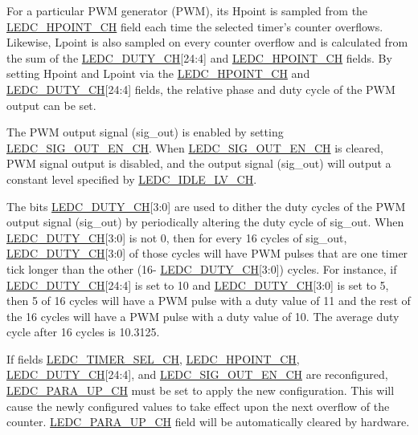 \documentclass[main\_\_EN.tex]{subfiles}
\begin{document}
For a particular PWM generator (PWM), its Hpoint is sampled from the \hyperref[fielddesc:LEDCHPOINTCHN]{LEDC\_HPOINT\_CH} field each time the selected timer's counter overflows. Likewise, Lpoint is also sampled on every counter overflow and is calculated from the sum of the \hyperref[fielddesc:LEDCDUTYCHN]{LEDC\_DUTY\_CH}[24:4] and \hyperref[fielddesc:LEDCHPOINTCHN]{LEDC\_HPOINT\_CH} fields. By setting Hpoint and Lpoint via the \hyperref[fielddesc:LEDCHPOINTCHN]{LEDC\_HPOINT\_CH} and \hyperref[fielddesc:LEDCDUTYCHN]{LEDC\_DUTY\_CH}[24:4] fields, the relative phase and duty cycle of the PWM output can be set.

The PWM output signal (sig\_out) is enabled by setting \hyperref[fielddesc:LEDCSIGOUTENCHN]{LEDC\_SIG\_OUT\_EN\_CH}. When \hyperref[fielddesc:LEDCSIGOUTENCHN]{LEDC\_SIG\_OUT\_EN\_CH} is cleared, PWM signal output is disabled, and the output signal (sig\_out) will output a constant level specified by \hyperref[fielddesc:LEDCIDLELVCHN]{LEDC\_IDLE\_LV\_CH}.

The bits \hyperref[fielddesc:LEDCDUTYCHN]{LEDC\_DUTY\_CH}[3:0] are used to dither the duty cycles of the PWM output signal (sig\_out) by periodically altering the duty cycle of sig\_out. When \hyperref[fielddesc:LEDCDUTYCHN]{LEDC\_DUTY\_CH}[3:0] is not 0, then for every 16 cycles of sig\_out, \hyperref[fielddesc:LEDCDUTYCHN]{LEDC\_DUTY\_CH}[3:0] of those cycles will have PWM pulses that are one timer tick longer than the other (16- \hyperref[fielddesc:LEDCDUTYCHN]{LEDC\_DUTY\_CH}[3:0]) cycles. For instance, if \hyperref[fielddesc:LEDCDUTYCHN]{LEDC\_DUTY\_CH}[24:4] is set to 10 and \hyperref[fielddesc:LEDCDUTYCHN]{LEDC\_DUTY\_CH}[3:0] is set to 5, then 5 of 16 cycles will have a PWM pulse with a duty value of 11 and the rest of the 16 cycles will have a PWM pulse with a duty value of 10. The average duty cycle after 16 cycles is 10.3125.

If fields \hyperref[fielddesc:LEDCTIMERSELCHN]{LEDC\_TIMER\_SEL\_CH},
\hyperref[fielddesc:LEDCHPOINTCHN]{LEDC\_HPOINT\_CH}, \hyperref[fielddesc:LEDCDUTYCHN]{LEDC\_DUTY\_CH}[24:4], and  \hyperref[fielddesc:LEDCSIGOUTENCHN]{LEDC\_SIG\_OUT\_EN\_CH} are reconfigured, \hyperref[fielddesc:LEDCPARAUPCHN]{LEDC\_PARA\_UP\_CH} must be set to apply the new configuration. This will cause the newly configured values to take effect upon the next overflow of the counter. \hyperref[fielddesc:LEDCPARAUPCHN]{LEDC\_PARA\_UP\_CH} field will be automatically cleared by hardware.
\end{document}
